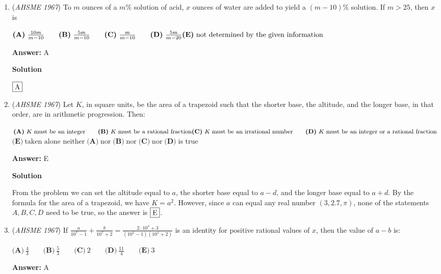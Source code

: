 \begin{enumerate}
	\item (\textit{AHSME 1967}) To $m$ ounces of a $m\%$ solution of acid, $x$ ounces of water are added to yield a $(m-10)\%$ solution.  If $m>25$, then $x$ is 


 $\textbf{(A)}\ \frac{10m}{m-10} \qquad \textbf{(B)}\ \frac{5m}{m-10} \qquad \textbf{(C)}\ \frac{m}{m-10} \qquad \textbf{(D)}\ \frac{5m}{m-20} \\ \textbf{(E)}\ \text{not determined by the given information}$

 \textbf{Answer: }A



\textbf{Solution}

$\fbox{A}$



	\item (\textit{AHSME 1967}) Let $K$, in square units, be the area of a trapezoid such that the shorter base, the altitude, and the longer base, in that order, are in arithmetic progression.  Then:


 $\textbf{(A)}\ K \; \text{must be an integer} \qquad \textbf{(B)}\ K \; \text{must be a rational fraction} \\ \textbf{(C)}\ K \; \text{must be an irrational number} \qquad \textbf{(D)}\ K\;  \text{must be an integer or a rational fraction} \qquad$
$\textbf{(E)}\ \text{taken alone neither} \; \textbf{(A)} \; \text{nor} \; \textbf{(B)} \; \text{nor} \; \textbf{(C)} \; \text{nor} \; \textbf{(D)} \; \text{is true}$

 \textbf{Answer: }E



\textbf{Solution}

From the problem we can set the altitude equal to $a$, the shorter base equal to $a-d$, and the longer base equal to $a+d$. By the formula for the area of a trapezoid, we have $K=a^2$. However, since $a$ can equal any real number $(3, 2.7, \pi)$, none of the statements $A, B, C, D$ need to be true, so the answer is $\fbox{E}$.

 


	\item (\textit{AHSME 1967}) If $\frac{a}{10^x-1}+\frac{b}{10^x+2}=\frac{2 \cdot 10^x+3}{(10^x-1)(10^x+2)}$ is an identity for positive rational values of $x$, then the value of $a-b$ is:


 $\textbf{(A)}\ \frac{4}{3} \qquad \textbf{(B)}\ \frac{5}{3} \qquad \textbf{(C)}\ 2 \qquad \textbf{(D)}\ \frac{11}{4} \qquad \textbf{(E)}\ 3$

 \textbf{Answer: }A




\end{enumerate}
